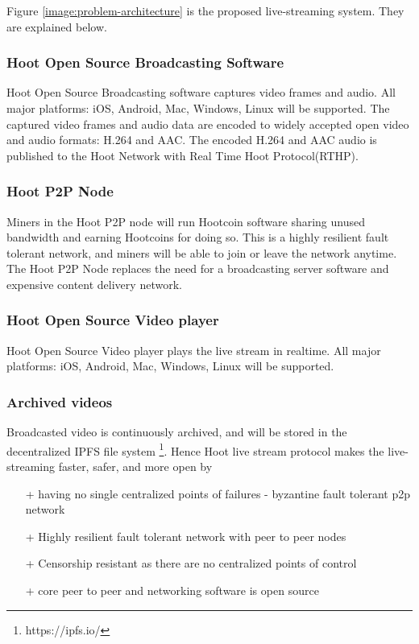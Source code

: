 \documentclass{article}
\begin{document}
Figure \ref{image:problem-architecture} is the proposed live-streaming system. They are explained below.
\subsubsection{Hoot Open Source Broadcasting Software}
Hoot Open Source Broadcasting software captures video frames and audio. All major platforms: iOS, Android, Mac, Windows, Linux will be supported. The captured video frames and audio data are encoded to widely accepted open video and audio formats: H.264 and AAC. The encoded H.264 and AAC audio is published to the Hoot Network with Real Time Hoot Protocol(RTHP).

\subsubsection{Hoot P2P Node}
Miners in the Hoot P2P node will run Hootcoin software sharing unused bandwidth and earning Hootcoins for doing so. This is a highly resilient fault tolerant network, and miners will be able to join or leave the network anytime. The Hoot P2P Node replaces the need for a broadcasting server software and expensive content delivery network.

\subsubsection{Hoot Open Source Video player}
Hoot Open Source Video player plays the live stream in realtime. All major platforms: iOS, Android, Mac, Windows, Linux will be supported.

\subsubsection{Archived videos}
Broadcasted video is continuously archived, and will be stored in the decentralized IPFS file system  \footnote{https://ipfs.io/}. Hence Hoot live stream protocol makes the live-streaming faster, safer, and more open by
\begin{itemize}
  \item[+]having no single centralized points of failures - byzantine fault tolerant p2p network
  \item[+]Highly resilient fault tolerant network with peer to peer nodes
  \item[+]Censorship resistant as there are no centralized points of control
  \item[+]core peer to peer and networking software is open source
\end{itemize}
\end{document}
